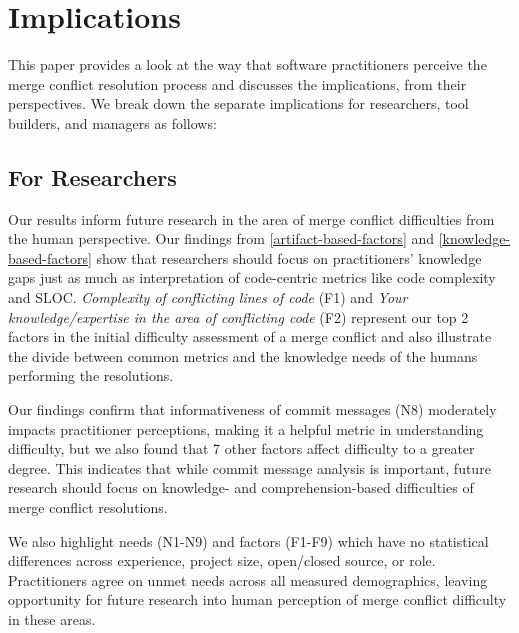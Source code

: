 \section{Implications}\label{implications}

This paper provides a look at the way that software practitioners perceive the merge conflict resolution process and discusses the implications, from their perspectives. We break down the separate implications for researchers, tool builders, and managers as follows:

\subsection{For Researchers}
Our results inform future research in the area of merge conflict difficulties from the human perspective.
Our findings from \ref{artifact-based-factors} and \ref{knowledge-based-factors} show that researchers should focus on practitioners' knowledge gaps just as much as interpretation of code-centric metrics like code complexity and SLOC. \textit{Complexity of conflicting lines of code} (F1) and \textit{Your knowledge/expertise in the area of conflicting code} (F2) represent our top 2 factors in the initial difficulty assessment of a merge conflict and also illustrate the divide between common metrics and the knowledge needs of the humans performing the resolutions.
 
Our findings confirm that informativeness of commit messages (N8) moderately impacts practitioner perceptions, making it a helpful metric in understanding difficulty, but we also found that 7 other factors affect difficulty to a greater degree. This indicates that while commit message analysis is important, future research should focus on knowledge- and comprehension-based difficulties of  merge conflict resolutions.

We also highlight needs (N1-N9) and factors (F1-F9) which have no statistical differences across experience, project size, open/closed source, or role. Practitioners agree on unmet needs across all measured demographics, leaving opportunity for future research into human perception of merge conflict difficulty in these areas.

 
